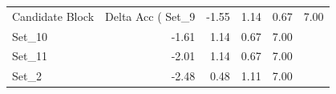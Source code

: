 \begin{tabular}{lrrrr}
\toprule
Candidate Block & Delta Acc (%
\midrule
Set_9 & -1.55 & 1.14 & 0.67 & 7.00 \\
Set_10 & -1.61 & 1.14 & 0.67 & 7.00 \\
Set_11 & -2.01 & 1.14 & 0.67 & 7.00 \\
Set_2 & -2.48 & 0.48 & 1.11 & 7.00 \\
\bottomrule
\end{tabular}

